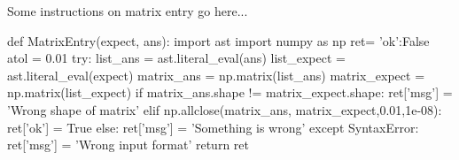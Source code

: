 Some instructions on matrix entry go here...

\begin{edXscript}
def MatrixEntry(expect, ans):
  	import ast
	import numpy as np 
	ret= {'ok':False}
  	atol = 0.01
  	try:
		list_ans = ast.literal_eval(ans)
		list_expect = ast.literal_eval(expect)
  		matrix_ans = np.matrix(list_ans)
  		matrix_expect = np.matrix(list_expect) 
  		if matrix_ans.shape != matrix_expect.shape:
  			ret['msg'] = 'Wrong shape of matrix'
  		elif np.allclose(matrix_ans, matrix_expect,0.01,1e-08):
  			ret['ok'] = True
  		else:
  			ret['msg'] = 'Something is wrong'
	except SyntaxError:
		ret['msg'] = 'Wrong input format'
  	return ret
\end{edXscript}

